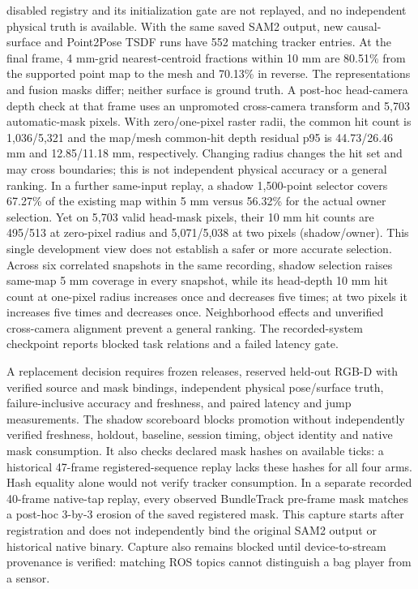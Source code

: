 \documentclass[10pt,journal]{IEEEtran}
\begin{document}
disabled registry and its initialization gate are not replayed, and no independent physical truth is available. With the same saved SAM2 output, new causal-surface and Point2Pose TSDF runs have 552 matching tracker entries. At the final frame, 4 mm-grid nearest-centroid fractions within 10 mm are 80.51\% from the supported point map to the mesh and 70.13\% in reverse. The representations and fusion masks differ; neither surface is ground truth. A post-hoc head-camera depth check at that frame uses an unpromoted cross-camera transform and 5,703 automatic-mask pixels. With zero/one-pixel raster radii, the common hit count is 1,036/5,321 and the map/mesh common-hit depth residual p95 is 44.73/26.46 mm and 12.85/11.18 mm, respectively. Changing radius changes the hit set and may cross boundaries; this is not independent physical accuracy or a general ranking. In a further same-input replay, a shadow 1,500-point selector covers 67.27\% of the existing map within 5 mm versus 56.32\% for the actual owner selection. Yet on 5,703 valid head-mask pixels, their 10 mm hit counts are 495/513 at zero-pixel radius and 5,071/5,038 at two pixels (shadow/owner). This single development view does not establish a safer or more accurate selection. Across six correlated snapshots in the same recording, shadow selection raises same-map 5 mm coverage in every snapshot, while its head-depth 10 mm hit count at one-pixel radius increases once and decreases five times; at two pixels it increases five times and decreases once. Neighborhood effects and unverified cross-camera alignment prevent a general ranking. The recorded-system checkpoint reports blocked task relations and a failed latency gate.

A replacement decision requires frozen releases, reserved held-out RGB-D with verified source and mask bindings, independent physical pose/surface truth, failure-inclusive accuracy and freshness, and paired latency and jump measurements. The shadow scoreboard blocks promotion without independently verified freshness, holdout, baseline, session timing, object identity and native mask consumption. It also checks declared mask hashes on available ticks: a historical 47-frame registered-sequence replay lacks these hashes for all four arms. Hash equality alone would not verify tracker consumption. In a separate recorded 40-frame native-tap replay, every observed BundleTrack pre-frame mask matches a post-hoc 3-by-3 erosion of the saved registered mask. This capture starts after registration and does not independently bind the original SAM2 output or historical native binary. Capture also remains blocked until device-to-stream provenance is verified: matching ROS topics cannot distinguish a bag player from a sensor.
\end{document}
